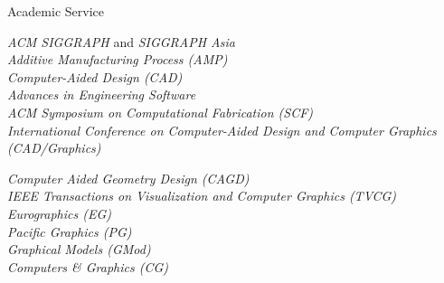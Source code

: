 \begin{rubric}{Academic Service}
\entry*[]
	\begin{minipage}[t]{0.48\textwidth}
		\textit{ACM SIGGRAPH} and \textit{SIGGRAPH Asia} \\
		\textit{Additive Manufacturing Process (AMP)} \\
		\textit{Computer-Aided Design (CAD)} \\
		\textit{Advances in Engineering Software} \\
		\textit{ACM Symposium on Computational Fabrication (SCF)} \\
		\textit{International Conference on Computer-Aided Design and Computer Graphics (CAD/Graphics)} \\

	\end{minipage}
	\hfill
	\begin{minipage}[t]{0.48\textwidth}
		\textit{Computer Aided Geometry Design (CAGD)} \\
		\textit{IEEE Transactions on Visualization and Computer Graphics (TVCG)} \\
		\textit{Eurographics (EG)} \\
		\textit{Pacific Graphics (PG)} \\
		\textit{Graphical Models (GMod)} \\
		\textit{Computers \& Graphics (CG)}
	\end{minipage}
\end{rubric}

